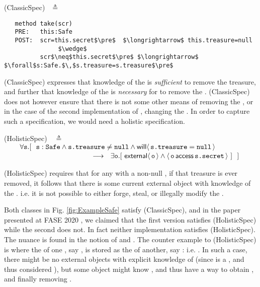   \vspace{.1in}
  
(ClassicSpec)$  \ \ $  $\triangleq$
\vspace{-.1in}
\begin{lstlisting}
   method take(scr)
   PRE:   this:Safe  
   POST:  scr=this.secret$\pre$  $\longrightarrow$ this.treasure=null 
               $\wedge$
          scr$\neq$this.secret$\pre$ $\longrightarrow$  $\forall$s:Safe.$\,$s.treasure=s.treasure$\pre$
 \end{lstlisting}
\vspace{-.2in}

(ClassicSpec)  expresses  that knowledge of the  is  \emph{sufficient} %
to remove the treasure, and further that  knowledge of the  is \emph{necessary} for
  to remove the . (ClassicSpec) does not however ensure that there
 is not some other means of removing the , or in the case of the second implementation
 of , changing the . In order to capture such a specification, we would need 
 a holistic specification.
 
 
 
\vspace{.1in}
(HolisticSpec)\ \  $\triangleq$\\ 
$\strut \hspace{.3in}   \forall \prg{s}. %
[\ \ \prg{s}:\prg{Safe} \wedge \prg{s.treasure}\neq\prg{null}   \wedge   \Future{\prg{s.treasure}=\prg{null}} $ \\ 
 $ \strut \hspace{4.3cm}     \longrightarrow \ \  \exists \prg{o}. [\  \External{\prg{o}} \wedge  \CanAccess{\prg{o}}{\prg{s.secret}}\ ]  \  \ ] \hfill $
\vspace{.1in}

(HolisticSpec) requires that for any  with a non-null , if
that treasure is ever removed, it follows that there is some current external object 
with knowledge of the . i.e. it is not possible to either forge, steal, 
or illegally modify the . 

Both classes in Fig. \ref{fig:ExampleSafe} satisfy (ClassicSpec), and in the paper presented at FASE 2020 \cite{FASE}, 
we claimed that the first version satisfies (HolisticSpec) while the second does not. In fact neither implementation satisfies 
(HolisticSpec). The nuance is found in the notion of  and . The counter example to (HolisticSpec)
is where the  of one , say , is stored as the  of another, say : i.e. . 
In such a case, there might be no external objects with explicit knowledge of  (since  is a , and thus considered ), but some object might 
know , and thus have a way to obtain , and finally removing . 

